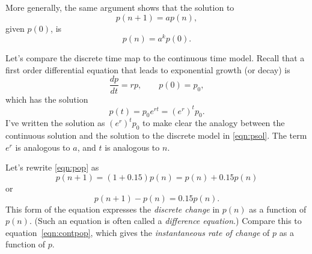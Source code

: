 \documentclass[reqno]{immbook}
\numberwithin{equation}{chapter}
\numberwithin{question}{section}
\numberwithin{theorem}{chapter}
\numberwithin{figure}{chapter}
\theoremstyle{definition}
\begin{document}
More generally, the same argument shows that the solution
to
\begin{equation}
   p(n+1) = a p(n),
\end{equation}
given $p(0)$, is
\begin{equation}
   p(n) = a^k p(0).
\label{eqn:psol}
\end{equation}

Let's compare the discrete time map to the continuous time model.
Recall that a first order differential equation
that leads to exponential growth
(or decay) is
\begin{equation}
 \frac{dp}{dt} = r p, \quad\quad p(0) = p_0,
\label{eqn:contpop}
\end{equation}
which has the solution
\begin{equation}
  p(t) = p_0e^{rt} = \left( e^r\right)^t p_0.
\end{equation}
I've written the solution as
$\left(e^r\right)^t p_0$ to make clear the analogy
between the continuous solution and the solution to the discrete
model in \eqref{eqn:psol}.
The term $e^r$ is analogous to $a$, and $t$ is analogous to $n$.

Let's rewrite \eqref{eqn:pop} as
\begin{equation}
  p(n+1) = (1 + 0.15)p(n) = p(n) + 0.15p(n)
\end{equation}
or
\begin{equation}
  p(n+1) - p(n) = 0.15p(n) .
\end{equation}
This form of the equation expresses the
\emph{discrete change} in
$p(n)$ as a function of $p(n)$.
(Such an equation is often called a \emph{difference equation}.)
Compare this to equation~\eqref{eqn:contpop}, which gives the
\emph{instantaneous rate of change} of $p$ as a function
of $p$.
\end{document}
